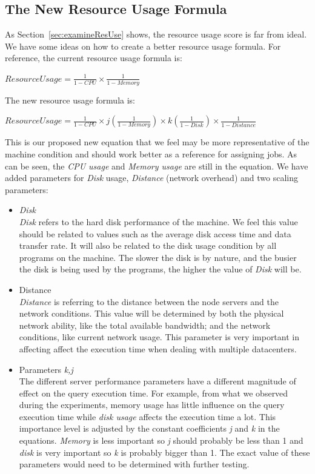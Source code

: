 \subsection{The New Resource Usage Formula}
\label{sec:usageFormula}
As Section~\ref{sec:examineResUse} shows, the resource usage score is far from ideal. We have some ideas on how to create a better resource usage formula. For reference, the current resource usage formula is:

\begin{center}
$ResourceUsage = \frac{1}{1-CPU} \times \frac{1}{1-Memory}$
\end{center}

The new resource usage formula is:
\begin{center}
$ResourceUsage = \frac{1}{1-CPU} \times j\left ( \frac{1}{1-Memory} \right ) \times k\left ( \frac{1}{1-Disk} \right ) \times \frac{1}{1-Distance}$
\end{center}

This is our proposed new equation that we feel may be more representative of the machine condition and should work better as a reference for assigning jobs. As can be seen, the \textit{CPU usage} and \textit{Memory usage} are still in the equation. We have added parameters for \textit{Disk} usage, \textit{Distance} (network overhead) and two scaling parameters:

\begin{itemize}
\item{\textit{Disk}} \\
\textit{Disk} refers to the hard disk performance of the machine. We feel this value should be related to values such as the average disk access time and data transfer rate. It will also be related to the disk usage condition by all programs on the machine. The slower the disk is by nature, and the busier the disk is being used by the programs, the higher the value of \textit{Disk} will be. 
\item{Distance} \\
\textit{Distance} is referring to the distance between the node servers and the network conditions. This value will be determined by both the physical network ability, like the total available bandwidth; and the network conditions, like current network usage. This parameter is very important in affecting affect the execution time when dealing with multiple datacenters.
\item{Parameters \textit{k,j}} \\
The different server performance parameters have a different magnitude of effect on the query execution time. For example, from what we observed during the experiments, memory usage has little influence on the query execution time while \textit{disk usage} affects the execution time a lot. This importance level is adjusted by the constant coefficients \textit{j} and \textit{k} in the equations. \textit{Memory} is less important so \textit{j} should probably be less than 1 and \textit{disk} is very important so \textit{k} is probably bigger than 1. The exact value of these parameters would need to be determined with further testing.
\end{itemize}

